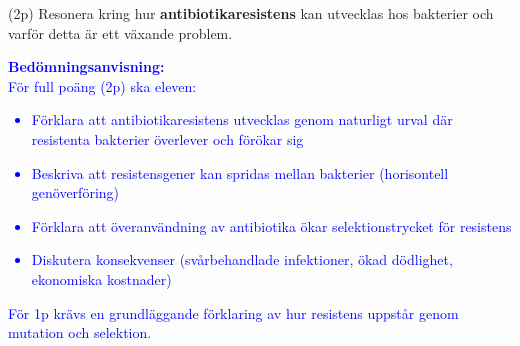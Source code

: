 \documentclass{exam}
\begin{document}
\begin{questions}
\question (2p) Resonera kring hur \textbf{antibiotikaresistens} kan utvecklas hos bakterier och varför detta är ett växande problem.

\textcolor{blue}{
\textbf{Bedömningsanvisning:}\\
För full poäng (2p) ska eleven:
\begin{itemize}
\item Förklara att antibiotikaresistens utvecklas genom naturligt urval där resistenta bakterier överlever och förökar sig
\item Beskriva att resistensgener kan spridas mellan bakterier (horisontell genöverföring)
\item Förklara att överanvändning av antibiotika ökar selektionstrycket för resistens
\item Diskutera konsekvenser (svårbehandlade infektioner, ökad dödlighet, ekonomiska kostnader)
\end{itemize}
För 1p krävs en grundläggande förklaring av hur resistens uppstår genom mutation och selektion.
}
\vspace{10mm}

\end{questions}
\end{document}
